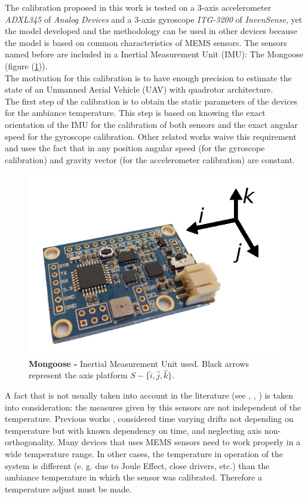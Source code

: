 \documentclass[conference]{IEEEtran}
\newcommand{\refp}[1]{(\ref{#1})}
\begin{document}
The calibration proposed in this work is tested on a 3-axis accelerometer \emph{ADXL345} of \emph{Analog Devices} and a 3-axis gyroscope \emph{ITG-3200} of \emph{InvenSense}, yet the model developed and the methodology can be used in other devices because the model is based on common characteristics of MEMS sensors. The sensors named before are included in a Inertial Measurement Unit (IMU): The Mongoose (figure \refp{fig:mongoose}). \\

The motivation for this calibration is to have enough precision to estimate the state of an Unmanned Aerial Vehicle (UAV) with quadrotor architecture.\\

The first step of the calibration is to obtain the static parameters of the devices for the ambiance temperature. This step is based on knowing the exact orientation of the IMU for the calibration of both sensors and the exact angular speed for the gyroscope calibration. Other related works waive this requirement \cite{bib:calib_imu, bib:kalman} and uses the fact that in any position angular speed (for the gyroscope calibration) and gravity vector (for the accelerometer calibration) are constant.\\

\begin{figure}[h]
	\centering
	\includegraphics[width=.6\columnwidth]{./pics_paper/mongoose.png}
	\caption{\textbf{Mongoose -} Inertial Measurement Unit used. Black arrows represent the axis platform $S - \{\hat{i}, \hat{j}, \hat{k} \}$. }
	\label{fig:mongoose}
\end{figure}

A fact that is not usually taken into account in the literature (see \cite{bib:calib_imu}, \cite{bib:kalman}, \cite{bib:calib_imu_dos}) is taken into consideration: the measures given by this sensors are not independent of the temperature. Previous works \cite{bib:ultimo_tio}, considered time varying drifts not depending on temperature but with known dependency on time, and neglecting axis non-orthogonality. Many devices that uses MEMS sensors need to work properly in a wide temperature range. In other cases, the temperature in operation of the system is different (e. g. due to Joule Effect, close drivers, etc.) than the ambiance temperature in which the sensor was calibrated. Therefore a temperature adjust must be made.
   
\end{document}
